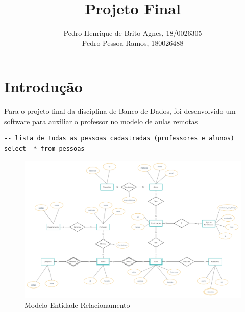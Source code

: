 \documentclass[12pt]{article}
\title{Projeto Final}
\author{Pedro Henrique de Brito Agnes, 18/0026305 \\
Pedro Pessoa Ramos, 180026488}
\date{}
\begin{document}
 
\maketitle

\section*{Introdução}

Para o projeto final da disciplina de Banco de Dados, foi desenvolvido um software para auxiliar o professor no modelo de aulas remotas

\begin{lstlisting}
-- lista de todas as pessoas cadastradas (professores e alunos)
select	* from pessoas
\end{lstlisting}

\begin{figure}[H]
	\centering
    \includegraphics[width=1\textwidth]{MER.png}
    \caption{Modelo Entidade Relacionamento}
\end{figure}
\end{document}
